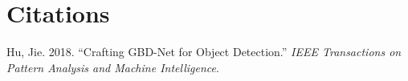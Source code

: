 \documentclass[
  11pt,
]{article}
\newlength{\cslhangindent}
\newlength{\cslentryspacingunit} %
\newenvironment{CSLReferences}[2] %
 {%
  \setlength{\parindent}{0pt}
  \ifodd #1
  \let\oldpar\par
  \def\par{\hangindent=\cslhangindent\oldpar}
  \fi
  \setlength{\parskip}{#2\cslentryspacingunit}
 }%
 {}
\begin{document}
\pagebreak

\hypertarget{citations}{%
\section*{Citations}\label{citations}}

\hypertarget{refs}{}
\begin{CSLReferences}{1}{0}
\leavevmode{}%
Hu, Jie. 2018. {``{Crafting GBD-Net for Object Detection}.''} \emph{IEEE
Transactions on Pattern Analysis and Machine Intelligence}.

\end{CSLReferences}
\end{document}
